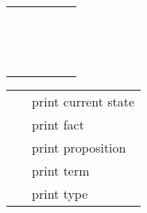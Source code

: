 \begin{isabellebody}
\begin{isamarkuptext}
\begin{tabular}{rcl}
    \hyperlink{command.obtain}{\mbox{\isa{\isacommand{obtain}}}}~\isa{{\isaliteral{22}{\isachardoublequote}}x\ {\isaliteral{5C3C57484552453E}{\isasymWHERE}}\ a{\isaliteral{3A}{\isacharcolon}}\ {\isaliteral{5C3C7068693E}{\isasymphi}}{\isaliteral{22}{\isachardoublequote}}} & \isa{{\isaliteral{22}{\isachardoublequote}}{\isaliteral{5C3C617070726F783E}{\isasymapprox}}{\isaliteral{22}{\isachardoublequote}}} &
      \isa{{\isaliteral{22}{\isachardoublequote}}{\isaliteral{5C3C646F74733E}{\isasymdots}}{\isaliteral{22}{\isachardoublequote}}}~\hyperlink{command.fix}{\mbox{\isa{\isacommand{fix}}}}~\isa{x}~\hyperlink{command.assume}{\mbox{\isa{\isacommand{assume}}}}~\isa{{\isaliteral{22}{\isachardoublequote}}a{\isaliteral{3A}{\isacharcolon}}\ {\isaliteral{5C3C7068693E}{\isasymphi}}{\isaliteral{22}{\isachardoublequote}}} \\
    \hyperlink{command.case}{\mbox{\isa{\isacommand{case}}}}~\isa{c} & \isa{{\isaliteral{22}{\isachardoublequote}}{\isaliteral{5C3C617070726F783E}{\isasymapprox}}{\isaliteral{22}{\isachardoublequote}}} &
      \hyperlink{command.fix}{\mbox{\isa{\isacommand{fix}}}}~\isa{x}~\hyperlink{command.assume}{\mbox{\isa{\isacommand{assume}}}}~\isa{{\isaliteral{22}{\isachardoublequote}}c{\isaliteral{3A}{\isacharcolon}}\ {\isaliteral{5C3C7068693E}{\isasymphi}}{\isaliteral{22}{\isachardoublequote}}} \\
    \hyperlink{command.sorry}{\mbox{\isa{\isacommand{sorry}}}} & \isa{{\isaliteral{22}{\isachardoublequote}}{\isaliteral{5C3C617070726F783E}{\isasymapprox}}{\isaliteral{22}{\isachardoublequote}}} &
      \hyperlink{command.by}{\mbox{\isa{\isacommand{by}}}}~\isa{cheating} \\
  \end{tabular}%
\end{isamarkuptext}%
\isamarkuptrue%
%
\isamarkuptrue%
%
\begin{isamarkuptext}%
\begin{tabular}{ll}
    \hyperlink{command.pr}{\mbox{\isa{\isacommand{pr}}}} & print current state \\
    \hyperlink{command.thm}{\mbox{\isa{\isacommand{thm}}}}~\isa{a} & print fact \\
    \hyperlink{command.prop}{\mbox{\isa{\isacommand{prop}}}}~\isa{{\isaliteral{5C3C7068693E}{\isasymphi}}} & print proposition \\
    \hyperlink{command.term}{\mbox{\isa{\isacommand{term}}}}~\isa{t} & print term \\
    \hyperlink{command.typ}{\mbox{\isa{\isacommand{typ}}}}~\isa{{\isaliteral{5C3C7461753E}{\isasymtau}}} & print type \\

\end{tabular}
\end{isamarkuptext}
\end{isabellebody}
